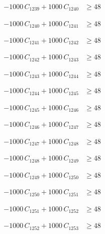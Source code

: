 \documentclass[a4paper,11pt]{article}
\begin{document}
\begin{align}
-1000\,C_{1239} + 1000\,C_{1240} &\geq 48 \nonumber
\end{align}

\begin{align}
-1000\,C_{1240} + 1000\,C_{1241} &\geq 48 \nonumber
\end{align}

\begin{align}
-1000\,C_{1241} + 1000\,C_{1242} &\geq 48 \nonumber
\end{align}

\begin{align}
-1000\,C_{1242} + 1000\,C_{1243} &\geq 48 \nonumber
\end{align}

\begin{align}
-1000\,C_{1243} + 1000\,C_{1244} &\geq 48 \nonumber
\end{align}

\begin{align}
-1000\,C_{1244} + 1000\,C_{1245} &\geq 48 \nonumber
\end{align}

\begin{align}
-1000\,C_{1245} + 1000\,C_{1246} &\geq 48 \nonumber
\end{align}

\begin{align}
-1000\,C_{1246} + 1000\,C_{1247} &\geq 48 \nonumber
\end{align}

\begin{align}
-1000\,C_{1247} + 1000\,C_{1248} &\geq 48 \nonumber
\end{align}

\begin{align}
-1000\,C_{1248} + 1000\,C_{1249} &\geq 48 \nonumber
\end{align}

\begin{align}
-1000\,C_{1249} + 1000\,C_{1250} &\geq 48 \nonumber
\end{align}

\begin{align}
-1000\,C_{1250} + 1000\,C_{1251} &\geq 48 \nonumber
\end{align}

\begin{align}
-1000\,C_{1251} + 1000\,C_{1252} &\geq 48 \nonumber
\end{align}

\begin{align}
-1000\,C_{1252} + 1000\,C_{1253} &\geq 48 \nonumber
\end{align}
\end{document}
